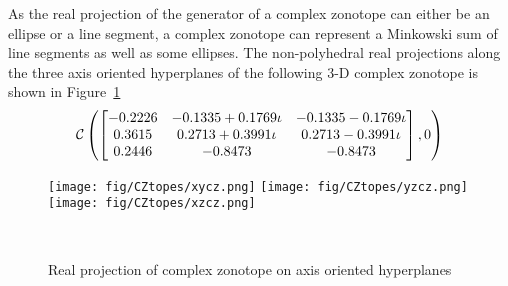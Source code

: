 
As the real projection of the generator of a complex zonotope can
either be an ellipse or a line segment, a complex zonotope can
represent a Minkowski sum of line segments as well as some
ellipses.  The non-polyhedral real projections along the three axis
oriented hyperplanes of the following 3-D complex zonotope is shown in
Figure~\ref{fig:3dcztope}
%
\[
\mathit{\mathcal{C}}\left(\left[\begin{matrix}-0.2226  & -0.1335 + 0.1769\iota  & -0.1335 - 0.1769\iota\\
   0.3615 &   0.2713 + 0.3991\iota &  0.2713 - 0.3991\iota\\
   0.2446 &  -0.8473 &  -0.8473\end{matrix}\right],0\right)
\]
%
\begin{figure}
\center
\texttt{[image: fig/CZtopes/xycz.png]}
\texttt{[image: fig/CZtopes/yzcz.png]}
\texttt{[image: fig/CZtopes/xzcz.png]}
\caption{Real projection of complex zonotope on axis oriented hyperplanes}~\label{fig:3dcztope}
\end{figure}
%

